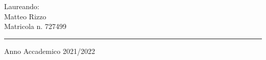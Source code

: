 \begin{titlepage}
    \vspace*{5mm}

    \begin{flushright}
    {\fontsize{17}{17}\selectfont
    Laureando:\\
    Matteo Rizzo\\
    Matricola n. 727499\\
    }

    \end{flushright}


    \vspace*{5mm}

    \rule{0.8\textwidth}{0.4pt}
    \begin{center}
    {\fontsize{17}{17}\selectfont
    Anno Accademico 2021/2022
    }
    \end{center}


\end{titlepage}
\restoregeometry
